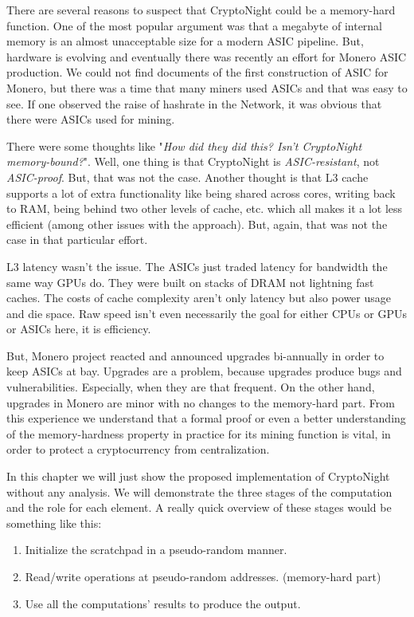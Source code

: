 There are several reasons to suspect that CryptoNight could be a memory-hard function. One of the most popular argument was that a megabyte of internal memory is an almost unacceptable size for a modern ASIC pipeline. But, hardware is evolving and eventually there was recently an effort for Monero ASIC production. We could not find documents of the first construction of ASIC for Monero, but there was a time that many miners used ASICs and that was easy to see. If one observed the raise of hashrate in the Network, it was obvious that there were ASICs used for mining.

There were some thoughts like "\emph{How did they did this? Isn't CryptoNight memory-bound?}". Well, one thing is that CryptoNight is \emph{ASIC-resistant}, not \emph{ASIC-proof}. But, that was not the case. Another thought is that L3 cache supports a lot of extra functionality like being shared across cores, writing back to RAM, being behind two other levels of cache, etc. which all makes it a lot less efficient (among other issues with the approach). But, again, that was not the case in that particular effort.

L3 latency wasn't the issue. The ASICs just traded latency for bandwidth the same way GPUs do. They were built on stacks of DRAM not lightning fast caches. The costs of cache complexity aren't only latency but also power usage and die space. Raw speed isn't even necessarily the goal for either CPUs or GPUs or ASICs here, it is efficiency.

But, Monero project reacted and announced upgrades bi-annually in order to keep ASICs at bay. Upgrades are a problem, because upgrades produce bugs and vulnerabilities. Especially, when they are that frequent. On the other hand, upgrades in Monero are minor with no changes to the memory-hard part. From this experience we understand that a formal proof or even a better understanding of the memory-hardness property in practice for its mining function is vital, in order to protect a cryptocurrency from centralization.

In this chapter we will just show the proposed implementation of CryptoNight without any analysis. We will demonstrate the three stages of the computation and the role for each element. A really quick overview of these stages would be something like this:

\begin{enumerate}
  \item Initialize the scratchpad in a pseudo-random manner.
  \item Read/write operations at pseudo-random addresses. (memory-hard part)
  \item Use all the computations' results to produce the output.
\end{enumerate}

